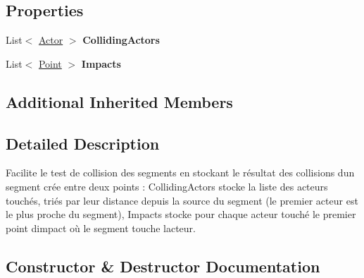 \subsection*{Properties}
\begin{DoxyCompactItemize}
\item 
\mbox{\label{class_tentacle_slicers_1_1collisions_1_1_rayon_caster_a6e696f3cbcda1addf00a2c7c47fd751b}} 
List$<$ \hyperlink{class_tentacle_slicers_1_1actors_1_1_actor}{Actor} $>$ {\bfseries Colliding\+Actors}
\item 
\mbox{\label{class_tentacle_slicers_1_1collisions_1_1_rayon_caster_ac027555d5252a6e5ded8bfba17165b37}} 
List$<$ \hyperlink{class_tentacle_slicers_1_1general_1_1_point}{Point} $>$ {\bfseries Impacts}
\end{DoxyCompactItemize}
\subsection*{Additional Inherited Members}


\subsection{Detailed Description}
Facilite le test de collision des segments en stockant le résultat des collisions d\textquotesingle{}un segment crée entre deux points \+: Colliding\+Actors stocke la liste des acteurs touchés, triés par leur distance depuis la source du segment (le premier acteur est le plus proche du segment), Impacts stocke pour chaque acteur touché le premier point d\textquotesingle{}impact où le segment touche l\textquotesingle{}acteur. 



\subsection{Constructor \& Destructor Documentation}
\mbox{\label{class_tentacle_slicers_1_1collisions_1_1_rayon_caster_ae43e7cab7009f87dc9aac003339b8a71}} 
